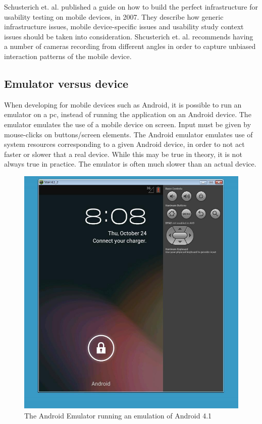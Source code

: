 Schusterich et. al.\cite{schusteritsch2007towards} published a guide on how to build the perfect infrastructure for usability testing on mobile devices, in 2007. They describe how generic infrastructure issues, mobile device-specific issues and usability study context issues should be taken into consideration. Shcusterich et. al. recommends having a number of cameras recording from different angles in order to capture unbiased interaction patterns of the mobile device. 

\subsection{Emulator versus device}
When developing for mobile devices such as Android, it is possible to run an emulator on a pc, instead of running the application on an Android device. The emulator emulates the use of a mobile device on screen. Input must be given by mouse-clicks on buttons/screen elements. The Android emulator emulates use of system resources corresponding to a given Android device, in order to not act faster or slower that a real device. While this may be true in theory, it is not always true in practice. The emulator is often much slower than an actual device.


\begin{figure}
\begin{center}
\includegraphics[scale=0.4]{Pictures/app-screenshots/androidemulator.png}
\end{center}
\caption{The Android Emulator running an emulation of Android 4.1}
\label{fig:androidemulator}
\end{figure}

